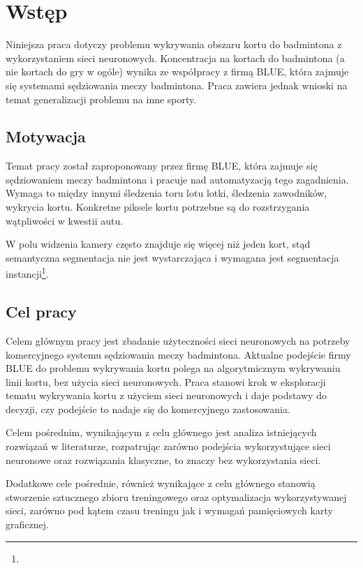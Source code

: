 \chapter{Wstęp}

Niniejsza praca dotyczy problemu wykrywania obszaru kortu do badmintona z wykorzystaniem sieci neuronowych.
Koncentracja na kortach do badmintona (a nie kortach do gry w ogóle) wynika ze współpracy z firmą BLUE, która zajmuje się systemami sędziowania meczy badmintona. Praca zawiera jednak wnioski na temat generalizacji problemu na inne sporty.

\section{Motywacja}

Temat pracy został zaproponowany przez firmę BLUE, która zajmuje się sędziowaniem meczy badmintona i pracuje nad automatyzacją tego zagadnienia. Wymaga to między innymi śledzenia toru lotu lotki, śledzenia zawodników, wykrycia kortu. Konkretne piksele kortu potrzebne są do rozstrzygania wątpliwości w kwestii autu.

W polu widzenia kamery często znajduje się więcej niż jeden kort, stąd semantyczna segmentacja nie jest wystarczająca i wymagana jest segmentacja instancji\footnote{}.

\section{Cel pracy}

Celem głównym pracy jest zbadanie użyteczności sieci neuronowych na potrzeby komercyjnego systemu sędziowania meczy badmintona. Aktualne podejście firmy BLUE do problemu wykrywania kortu polega na algorytmicznym wykrywaniu linii kortu, bez użycia sieci neuronowych. Praca stanowi krok w eksploracji tematu wykrywania kortu z użyciem sieci neuronowych i daje podstawy do decyzji, czy podejście to nadaje się do komercyjnego zastosowania.

Celem pośrednim, wynikającym z celu głównego jest analiza istniejących rozwiązań w literaturze, rozpatrując zarówno podejścia wykorzystujące sieci neuronowe oraz rozwiązania klasyczne, to znaczy bez wykorzystania sieci.

Dodatkowe cele pośrednie, również wynikające z celu głównego stanowią stworzenie sztucznego zbioru treningowego oraz optymalizacja wykorzystywanej sieci, zarówno pod kątem czasu treningu jak i wymagań pamięciowych karty graficznej.

